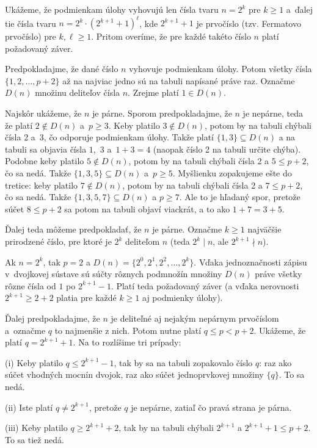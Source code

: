 {%
Ukážeme, že podmienkam úlohy vyhovujú len čísla tvaru $n=2^k$ pre $k\ge 1$
a~ďalej tie čísla tvaru $n = 2^{k}\cdot (2^{k+1} + 1)^\ell$, kde $2^{k+1} + 1$ je prvočíslo (tzv. Fermatovo prvočíslo) pre $k,\ell\ge 1$. Pritom overíme, že pre každé takéto číslo $n$ platí požadovaný záver.

Predpokladajme, že dané číslo $n$ vyhovuje podmienkam úlohy. Potom všetky čísla $\{1,2,\ldots, p+2\}$ až na najviac jedno sú na tabuli napísané práve raz. Označme $D(n)$ množinu deliteľov čísla $n$. Zrejme platí $1\in D(n)$.

Najskôr ukážeme, že $n$ je párne. Sporom predpokladajme, že $n$ je nepárne, teda že platí $2\notin D(n)$ a~$p\ge 3$.
Keby platilo $3\notin D(n)$, potom by na tabuli chýbali čísla 2 a~3, čo odporuje podmienkam úlohy. Takže platí $\{1,3\}\subseteq D(n)$ a na tabuli sa objavia čísla $1$,~$3$ a~${1+3=4}$ (naopak číslo 2 na tabuli určite chýba).
Podobne keby platilo $5\notin D(n)$, potom by na tabuli chýbali čísla 2 a $5\le p+2$, čo sa nedá. Takže $\{1,3,5\}\subseteq D(n)$ a~$p\ge 5$.
Myšlienku zopakujeme ešte do tretice: keby platilo $7\notin D(n)$, potom by na tabuli chýbali čísla 2 a $7\le p+2$, čo sa nedá.
Takže $\{1,3,5,7\}\subseteq D(n)$ a $p\ge 7$. Ale to je hľadaný spor, pretože súčet $8\le p+2$ sa potom na tabuli objaví viackrát, a to ako $1+7=3+5$.

Ďalej teda môžeme predpokladať, že $n$ je párne. Označme $k\ge 1$ najväčšie prirodzené číslo, pre ktoré je $2^k$ deliteľom $n$ (teda $2^k\mid n$, ale $2^{k+1}\nmid n$).

Ak $n=2^k$, tak $p=2$ a $D(n)=\{2^0,2^1,2^2,\ldots,2^k\}$. Vďaka jednoznačnosti zápisu v~dvojkovej sústave sú súčty rôznych podmnožín množiny $D(n)$ práve všetky rôzne čísla od $1$ po $2^{k+1}-1$. Platí teda požadovaný záver (a vďaka nerovnosti $2^{k+1}\ge 2+2$ platia pre každé $k\ge 1$ aj podmienky úlohy).

Ďalej predpokladajme, že $n$ je deliteľné aj nejakým nepárnym prvočíslom a~označme $q$ to najmenšie z nich. Potom nutne platí $q\le p<p+2$.
Ukážeme, že platí $q=2^{k + 1}+1$. Na to rozlíšime tri prípady:

\smallskip
\item{(i)} Keby platilo $q\le 2^{k + 1}-1$, tak by sa na tabuli zopakovalo číslo $q$: raz ako súčet vhodných mocnín dvojok, raz ako súčet jednoprvkovej množiny $\{q\}$. To sa nedá.
\item{(ii)} Iste platí $q\ne 2^{k + 1}$, pretože $q$ je nepárne, zatiaľ čo pravá strana je párna.
\item{(iii)} Keby platilo $q\ge 2^{k + 1}+2$, tak by na tabuli chýbali $2^{k + 1}$ a $2^{k + 1}+1\le p+2$. To sa tiež nedá.

}
